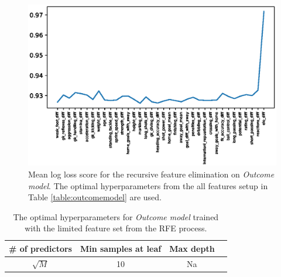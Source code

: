 \begin{figure}[H]
    \centering
    \includegraphics[width=1\textwidth]{img/optimal_avg_lloss.eps}
    \caption{Mean log loss score for the recursive feature elimination on \textit{Outcome model}. The optimal hyperparameters from the all features setup in Table \ref{table:outcomemodel} are used.}
    \label{fig:optimal_avg_loss}
\end{figure}

\begin{table}
    \caption{\textit{Outcome model's} simulation results using the limited feature set from the RFE process.}
    \label{table:outcomemodel_rfe}
\end{table}

\begin{table}
    \caption{The optimal hyperparameters for \textit{Outcome model} trained with the limited feature set from the RFE process.}
    \begin{tabular}{| c | c| c| c|}
        \hline
         \# of predictors & Min samples at leaf & Max depth\\
        \hline
         $\sqrt{M}$ & 10 & Na \\
        \hline
    \end{tabular}
    \label{table:hyperparam_results_rfe}
\end{table}


